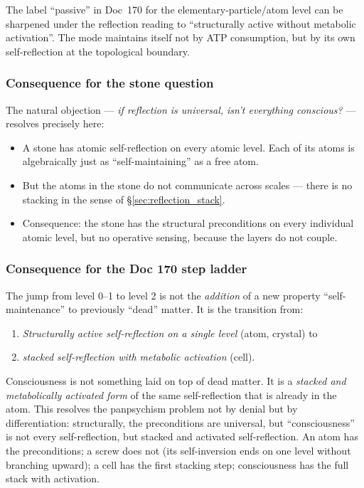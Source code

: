\begin{insightBox}
The label ``passive'' in Doc~170 for the elementary-particle/atom level can be sharpened under the reflection reading to ``structurally active without metabolic activation''. The mode maintains itself not by ATP consumption, but by its own self-reflection at the topological boundary.
\end{insightBox}

\subsubsection*{Consequence for the stone question}

The natural objection --- \emph{if reflection is universal, isn't everything conscious?} --- resolves precisely here:

\begin{itemize}
\item A stone has atomic self-reflection on every atomic level. Each of its atoms is algebraically just as ``self-maintaining'' as a free atom.
\item But the atoms in the stone do not communicate across scales --- there is no stacking in the sense of \S\ref{sec:reflection_stack}.
\item Consequence: the stone has the structural preconditions on every individual atomic level, but no operative sensing, because the layers do not couple.
\end{itemize}

\subsubsection*{Consequence for the Doc 170 step ladder}

The jump from level 0--1 to level 2 is not the \emph{addition} of a new property ``self-maintenance'' to previously ``dead'' matter. It is the transition from:

\begin{enumerate}
\item \emph{Structurally active self-reflection on a single level} (atom, crystal) to
\item \emph{stacked self-reflection with metabolic activation} (cell).
\end{enumerate}

\begin{interpretation}
Consciousness is not something laid on top of dead matter. It is a \emph{stacked and metabolically activated form} of the same self-reflection that is already in the atom. This resolves the panpsychism problem not by denial but by differentiation: structurally, the preconditions are universal, but ``consciousness'' is not every self-reflection, but stacked and activated self-reflection. An atom has the preconditions; a screw does not (its self-inversion ends on one level without branching upward); a cell has the first stacking step; consciousness has the full stack with activation.
\end{interpretation}

